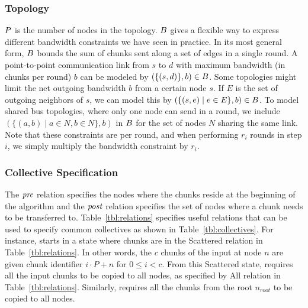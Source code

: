 \subsubsection{Topology}
\label{sec:topology}
$P$ is the number of nodes in the topology. $B$ gives a flexible
way to express different bandwidth constraints we have seen in
practice. In its most general form, $B$ bounds the sum of chunks
sent along a set of edges in a single round. A point-to-point
communication link from $s$ to $d$ with maximum bandwidth (in chunks
per round) $b$ can be modeled by $(\{(s, d)\}, b) \in B$. Some
topologies might limit the net outgoing bandwidth $b$ from a certain
node $s$. If $E$ is the set of outgoing neighbors of $s$, we can model
this by $(\{(s, e) \mid e \in E\}, b) \in B$. To model shared bus
topologies, where only one node can send in a round, we include
$(\{(a, b) \mid a \in N, b \in N\}, b)$ in $B$ for the set of nodes
$N$ sharing the same link. Note that these constraints are per round,
and when performing $r_i$ rounds in step $i$, we simply multiply the
bandwidth constraint by $r_i$.

\newcommand{\relAll}{All\xspace}
\newcommand{\relRoot}{Root\xspace}
\newcommand{\relScattered}{Scattered\xspace}
\newcommand{\relTranspose}{Transpose\xspace}
\newcommand{\chunkReduce}{\left\lfloor\frac{i}{\size}\right\rfloor}

\subsubsection{Collective Specification}
\label{sec:specifications}
The $\mathit{pre}$ relation specifies the nodes where the chunks reside at the
beginning of the algorithm and the $\mathit{post}$ relation specifies the set
of nodes where a chunk needs to be transferred to.
Table~\ref{tbl:relations} specifies useful relations that can be used
to specify common collectives as shown in Table~\ref{tbl:collectives}.
For instance, \allgather starts in a state where chunks are in the
\relScattered relation in Table~\ref{tbl:relations}. In other words,
the $c$ chunks of the input at node $n$ are given chunk identifier
$i\cdot P + n$ for $0 \leq i < c$. From this \relScattered state,
\allgather requires all the input chunks to be copied to all nodes, as
specified by \relAll relation in Table~\ref{tbl:relations}. Similarly,
\broadcast requires all the chunks from the root $n_{root}$ to be
copied to all nodes.

